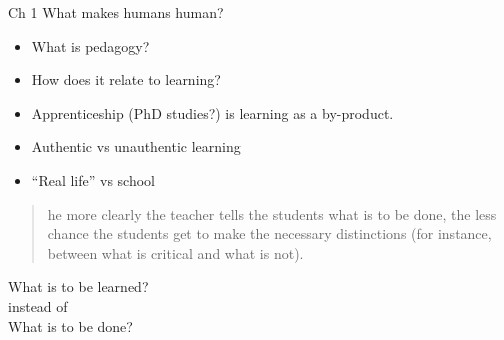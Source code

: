 \begin{frame}
  \begin{block}{Ch 1 What makes humans human?}
    \begin{itemize}
      \item What is pedagogy?
      \item How does it relate to learning?
    \end{itemize}
  \end{block}
\end{frame}

\begin{frame}
  \begin{example}
    \begin{itemize}
      \item Apprenticeship (PhD studies?) is learning as a by-product.
    \end{itemize}
  \end{example}
\end{frame}

\begin{frame}
  \begin{example}
    \begin{itemize}
      \item Authentic vs unauthentic learning
      \item \enquote{Real life} vs school
    \end{itemize}
  \end{example}
\end{frame}

\begin{frame}
  \begin{example}
    \blockcquote[p.~13]{NecessaryConditionsOfLearning}{%
      he more clearly the teacher tells the students what is to be 
      done, the less chance the students get to make the necessary distinctions 
      (for instance, between what is critical and what is not).%
    }
  \end{example}
\end{frame}

\begin{frame}
  \begin{center}
    What is to be learned?\\[1em]
    instead of\\[1em]
    What is to be done?
  \end{center}
\end{frame}

